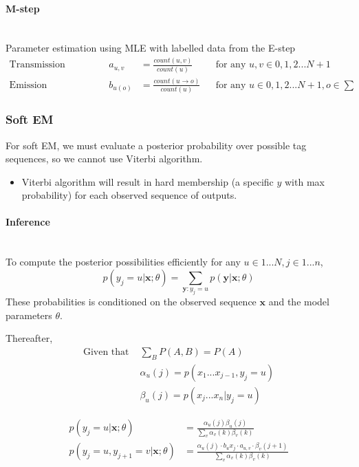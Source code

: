 \documentclass[a4paper]{article}
\begin{document}
\paragraph{M-step}\mbox{}\\

\noindent Parameter estimation using MLE with labelled data from the E-step 
\begin{align*}
	\text{Transmission Probability } && a_{u,v} &= \frac{count(u,v)}{count(u)} && \text{for any } u,v \in { 0,1,2...N+1}\\
	\text{Emission Probability } && b_{u(o)} &= \frac{count(u\rightarrow o)}{count(u)} && \text{for any } u \in { 0,1,2...N+1}, o \in \sum
\end{align*}

\subsubsection{Soft EM}
For soft EM, we must evaluate a posterior probability over possible tag sequences, so we cannot use Viterbi algorithm.

\begin{itemize}
	\item Viterbi algorithm will result in hard membership (a specific $y$ with max probability) for each observed sequence of outputs.
\end{itemize}

\paragraph{Inference}\mbox{}\\
To compute the posterior possibilities efficiently for any $u\in 1...N, j\in 1...n$,
$$ p(y_j=u|\textbf{x};\theta) = \sum_{\textbf{y}:y_j=u}p(\textbf{y}|\textbf{x};\theta) $$
These probabilities is conditioned on the observed sequence $\textbf{x}$ and the model parameters $\theta$.

\noindent Thereafter,
\begin{align*}
	 \text{Given that } &\sum_B P(A,B) = P(A)\\
	 &\alpha_u(j) = p(x_1...x_{j-1}, y_j=u)\\
	 & \beta_u(j) = p(x_j...x_{n} | y_j=u)
\end{align*}

\begin{align*}
	 p(y_j = u | \textbf{x};\theta) &= \frac{\alpha_u(j)\beta_u(j)}{\sum_v \alpha_v(k)\beta_v(k)}\\
	 p(y_j = u, y_{j+1} = v|\textbf{x};\theta) &= \frac{\alpha_u(j)\cdot b_u{x_j} \cdot a_{u,v} \cdot \beta_v(j+1)}{\sum_v \alpha_v(k)\beta_v(k)}
\end{align*}
\end{document}
